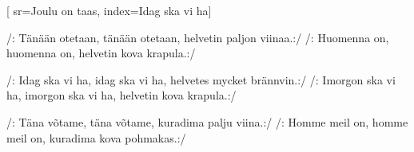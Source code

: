 [ 						
	sr={Joulu on taas},
	index={Idag ska vi ha}]		
	
\beginverse*						
/: Tänään otetaan, tänään otetaan, 
helvetin paljon viinaa.:/
/: Huomenna on, huomenna on,
helvetin kova krapula.:/
\endverse						

\beginverse				
/: Idag ska vi ha, idag ska vi ha,
helvetes mycket brännvin.:/
/: Imorgon ska vi ha, imorgon ska vi ha,
helvetin kova krapula.:/
\endverse
		

\beginverse				
/: Täna võtame, täna võtame,
kuradima palju viina.:/
/: Homme meil on, homme meil on,
kuradima kova pohmakas.:/

\endverse			
\endsong		
